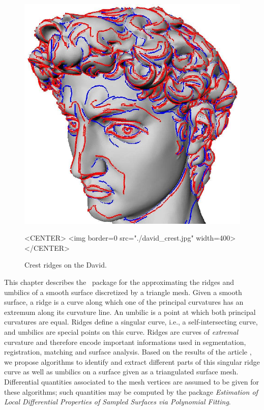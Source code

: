
\newtheorem{definition}{Definition.}
\newcommand{\hot}{h.o.t}%


\begin{figure}[!ht]
\begin{ccTexOnly}
\centerline{
\includegraphics[width=.5\linewidth]{Ridges_3/david_crest}}
\end{ccTexOnly}

\label{david-crest}
\begin{ccHtmlOnly}
<CENTER> <img border=0 src="./david_crest.jpg" width=400>
</CENTER>
\end{ccHtmlOnly}
\caption{Crest ridges on the David.}
\end{figure}

This chapter describes the \cgal\ package for the approximating the
ridges and umbilics of a smooth surface discretized by a triangle
mesh.  Given a smooth surface, a ridge is a curve along which one of
the principal curvatures has an extremum along its curvature line. An
umbilic is a point at which both principal curvatures are
equal. Ridges define a singular curve, i.e., a self-intersecting
curve, and umbilics are special points on this curve. Ridges are
curves of {\em extremal} curvature and therefore encode important
informations used in segmentation, registration, matching and surface
analysis.  Based on the results of the article
\cite{cgal:cp-tdare-05}, we propose algorithms to identify and extract
different parts of this singular ridge curve as well as umbilics on a
surface given as a triangulated surface mesh. Differential quantities
associated to the mesh vertices are assumed to be given for these
algorithms; such quantities may be computed by the package {\em
Estimation of Local Differential Properties of Sampled Surfaces via
Polynomial Fitting}.

